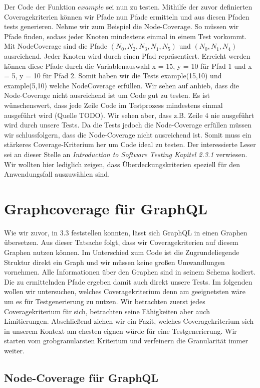 Der Code der Funktion $example$ sei nun zu testen.
Mithilfe der zuvor definierten Coveragekriterien können wir Pfade nun Pfade ermitteln und aus diesen Pfaden tests generieren.
Nehme wir zum Beispiel die Node-Coverage.
So müssen wir Pfade finden, sodass jeder Knoten mindestens einmal in einem Test vorkommt.
Mit NodeCoverage sind die Pfade $(N_0, N_2, N_3, N_1, N_5)$ und $(N_0, N_1, N_4)$ ausreichend.
Jeder Knoten wird durch einen Pfad repräsentiert.
Erreicht werden können diese Pfade durch die Variablenauswahl x = 15, y = 10 für Pfad 1 und x = 5, y = 10 für Pfad 2.
Somit haben wir die Tests example(15,10) und example(5,10) welche NodeCoverage erfüllen.
Wir sehen auf anhieb, dass die Node-Coverage nicht ausreichend ist um Code gut zu testen.
Es ist wünschenswert, dass jede Zeile Code im Testprozess mindestens einmal ausgeführt wird (Quelle TODO).
Wir sehen aber, dass z.B. Zeile 4 nie ausgeführt wird durch unsere Tests.
Da die Tests jedoch die Node-Coverage erfüllen müssen wir schlussfolgern, dass die Node-Coverage nicht ausreichend ist.
Somit muss ein stärkeres Coverage-Kriterium her um Code ideal zu testen.
Der interessierte Leser sei an dieser Stelle an \textit{Introduction to Software Testing Kapitel 2.3.1} \cite{software-testing} verwiesen.
Wir wollten hier lediglich zeigen, dass Überdeckungskriterien speziell für den Anwendungsfall auszuwählen sind.

\section{Graphcoverage für GraphQL}

Wie wir zuvor, in $3.3$ feststellen konnten, lässt sich GraphQL in einen Graphen übersetzen.
Aus dieser Tatsache folgt, dass wir Coveragekriterien auf diesem Graphen nutzen können.
Im Unterschied zum Code ist die Zugrundeliegende Struktur direkt ein Graph und wir müssen keine großen Umwandlungen vornehmen.
Alle Informationen über den Graphen sind in seinem Schema kodiert.
Die zu ermittelnden Pfade ergeben damit auch direkt unsere Tests.
Im folgenden wollen wir untersuchen, welches Coveragekriterium denn am geeignetsten wäre um es
für Testgenerierung zu nutzen.
Wir betrachten zuerst jedes Coveragekriterium für sich, betrachten seine Fähigkeiten aber auch Limitierungen.
Abschließend ziehen wir ein Fazit, welches Coveragekriterium sich in unserem Kontext am ehesten eignen würde für
eine Testgenerierung.
Wir starten vom grobgranularsten Kriterium und verfeinern die Granularität immer weiter.

\subsection{Node-Coverage für GraphQL}

